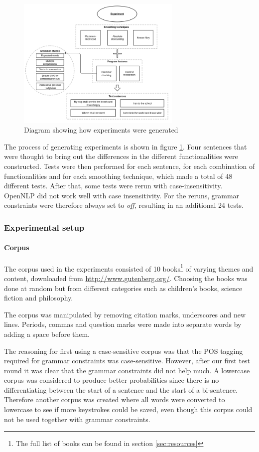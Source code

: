 \begin{figure}[t]
\center
\includegraphics[width=0.7\textwidth]{img/experiment_diagram.png}
\caption{Diagram showing how experiments were generated}
\label{fig:experiments}
\end{figure}

The process of generating experiments is shown in figure \ref{fig:experiments}. Four sentences that were thought to bring out the differences in the different functionalities were constructed. Tests were then performed for each sentence, for each combination of functionalities and for each smoothing technique, which made a total of 48 different tests. After that, some tests were rerun with case-insensitivity. OpenNLP did not work well with case insensitivity. For the reruns, grammar constraints were therefore always set to \emph{off}, resulting in an additional 24 tests.

\subsubsection{Experimental setup}
\paragraph{Corpus}
The corpus used in the experiments consisted of 10 books\footnote{The full list of books can be found in section \ref{sec:resources}} of varying themes and content, downloaded from \url{http://www.gutenberg.org/}. Choosing the books was done at random but from different categories such as children's books, science fiction and philosophy.

The corpus was manipulated by removing citation marks, underscores and new lines. Periods, commas and question marks were made into separate words by adding a space before them.

The reasoning for first using a case-sensitive corpus was that the POS tagging required for grammar constraints was case-sensitive. However, after our first test round it was clear that the grammar constraints did not help much. A lowercase corpus was considered to produce better probabilities since there is no differentiating between the start of a sentence and the start of a bi-sentence. Therefore another corpus was created where all words were converted to lowercase to see if more keystrokes could be saved, even though this corpus could not be used together with grammar constraints.